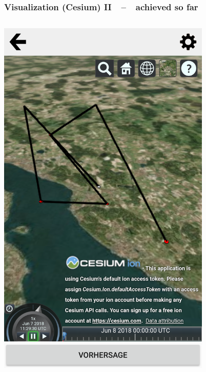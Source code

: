 \documentclass[xcolor=dvipsnames]{beamer}
\begin{document}
\begin{frame}
	\frametitle{\textbf{Visualization (Cesium) II}~~--~~achieved so far}
	\begin{columns}
	\begin{column}{0.5\textwidth}
		\includegraphics[width=0.8\textwidth]{screenshots/cesium-prediction1.png}
	\end{column}
	\begin{column}{0.5\textwidth}
		\begin{center}

\end{center}
\end{column}
\end{columns}
\end{frame}
\end{document}
